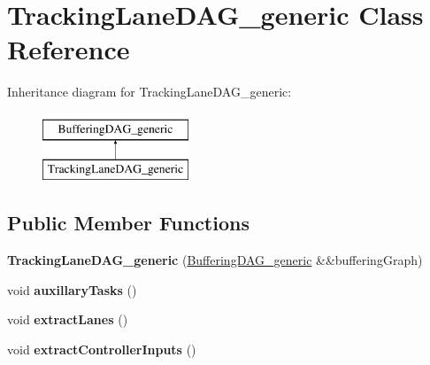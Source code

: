 \hypertarget{classTrackingLaneDAG__generic}{\section{Tracking\-Lane\-D\-A\-G\-\_\-generic Class Reference}
\label{classTrackingLaneDAG__generic}
}
Inheritance diagram for Tracking\-Lane\-D\-A\-G\-\_\-generic\-:\begin{figure}[H]
\begin{center}
\leavevmode
\includegraphics[height=2.000000cm]{classTrackingLaneDAG__generic}
\end{center}
\end{figure}
\subsection*{Public Member Functions}
\begin{DoxyCompactItemize}
\item 
\hypertarget{classTrackingLaneDAG__generic_adb64af801b50375a3f27aaf228d10a09}{{\bfseries Tracking\-Lane\-D\-A\-G\-\_\-generic} (\hyperlink{classBufferingDAG__generic}{Buffering\-D\-A\-G\-\_\-generic} \&\&buffering\-Graph)}\label{classTrackingLaneDAG__generic_adb64af801b50375a3f27aaf228d10a09}

\item 
\hypertarget{classTrackingLaneDAG__generic_a52e21e76e2751170a3a43ce303e3523e}{void {\bfseries auxillary\-Tasks} ()}\label{classTrackingLaneDAG__generic_a52e21e76e2751170a3a43ce303e3523e}

\item 
\hypertarget{classTrackingLaneDAG__generic_a6ae6159ff33fc58e7ee158cabba7cb23}{void {\bfseries extract\-Lanes} ()}\label{classTrackingLaneDAG__generic_a6ae6159ff33fc58e7ee158cabba7cb23}

\item 
\hypertarget{classTrackingLaneDAG__generic_a9ca038fa0421160e4445d6936f986e89}{void {\bfseries extract\-Controller\-Inputs} ()}\label{classTrackingLaneDAG__generic_a9ca038fa0421160e4445d6936f986e89}

\end{DoxyCompactItemize}

